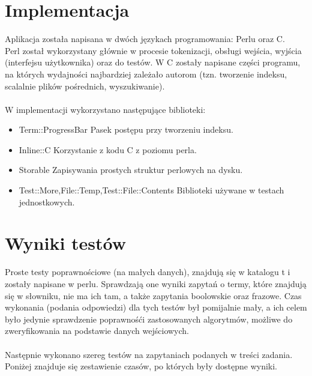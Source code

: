 \documentclass[11pt,leqno]{article}
\begin{document}
\section{Implementacja}

Aplikacja została napisana w dwóch językach programowania: Perlu oraz C.\\
Perl został wykorzystany głównie w procesie tokenizacji, obsługi wejścia, wyjścia (interfejsu użytkownika) oraz do testów. W C zostały napisane części programu, na których wydajności najbardziej zależało autorom (tzn. tworzenie indeksu, scalalnie plików pośrednich, wyszukiwanie).\\\\

W implementacji wykorzystano następujące biblioteki:
\begin{itemize}
\item Term::ProgressBar
Pasek postępu przy tworzeniu indeksu.

\item Inline::C
Korzystanie z kodu C z poziomu perla.

\item Storable
Zapisywania prostych struktur perlowych na dysku.

\item Test::More,File::Temp,Test::File::Contents
Biblioteki używane w testach jednostkowych.

\end{itemize}

\section{Wyniki testów}

Proste testy poprawnościowe (na małych danych), znajdują się w katalogu t i zostały napisane w perlu. Sprawdzają one wyniki zapytań o termy, które znajdują się w słowniku, nie ma ich tam, a także zapytania boolowskie oraz frazowe. Czas wykonania (podania odpowiedzi) dla tych testów był pomijalnie mały, a ich celem było jedynie sprawdzenie poprawnośći zastosowanych algorytmów, możliwe do zweryfikowania na podstawie danych wejściowych.\\\\

Następnie wykonano szereg testów na zapytaniach podanych w treści zadania. Poniżej znajduje się zestawienie czasów, po których były dostępne wyniki.\\
\end{document}
